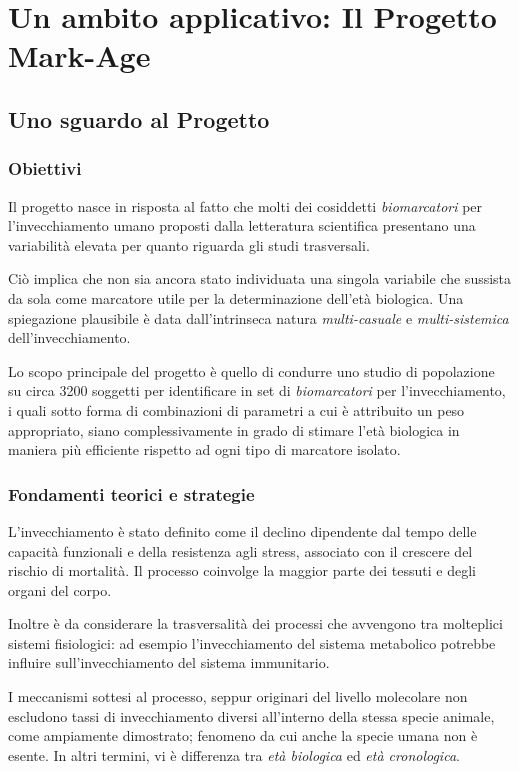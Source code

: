 \documentclass[12pt,openright,twoside,a4paper]{book}
\begin{document}
\chapter{Un ambito applicativo: Il Progetto Mark-Age}
\section{Uno sguardo al Progetto}
\subsection{Obiettivi}
Il progetto nasce in risposta al fatto che molti dei cosiddetti \textit{biomarcatori} per l'invecchiamento umano proposti dalla letteratura scientifica presentano una variabilità elevata per quanto riguarda gli studi trasversali.

Ciò implica che non sia ancora stato individuata una singola variabile che sussista da sola come marcatore utile per la determinazione dell'età biologica. Una spiegazione plausibile è data dall'intrinseca  natura \textit{multi-casuale} e \textit{multi-sistemica} dell'invecchiamento.



Lo scopo principale del progetto è quello di condurre uno studio di popolazione su circa 3200 soggetti per identificare in set di \textit{biomarcatori} per l'invecchiamento, i quali sotto forma di combinazioni di parametri a cui è attribuito un peso appropriato, siano complessivamente in grado di stimare l'età biologica in maniera più efficiente rispetto ad ogni tipo di marcatore isolato.

\subsection{Fondamenti teorici e strategie}
L'invecchiamento è stato definito come il declino dipendente dal tempo delle capacità funzionali e della resistenza agli stress, associato con il crescere del rischio di mortalità.
Il processo coinvolge la maggior parte dei tessuti e degli organi del corpo.

Inoltre è da considerare la trasversalità dei processi che avvengono tra molteplici sistemi fisiologici: ad esempio l'invecchiamento del sistema metabolico potrebbe influire sull'invecchiamento del sistema immunitario.

I meccanismi sottesi al processo, seppur originari del livello molecolare non escludono tassi di invecchiamento diversi all'interno della stessa specie animale, come ampiamente dimostrato; fenomeno da cui anche la specie umana non è esente. In altri termini, vi è differenza tra \textit{età biologica} ed \textit{età cronologica}.
\end{document}
